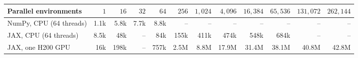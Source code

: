 \begin{tabular}{lrrrrrrrrrrr}
\toprule
Parallel environments & $1$ & $16$ & $32$ & $64$ & $256$ & $1{,}024$ & $4{,}096$ & $16{,}384$ & $65{,}536$ & $131{,}072$ & $262{,}144$ \\
\midrule
NumPy, CPU (64 threads) & 1.1k & 5.8k & 7.7k & 8.8k & -- & -- & -- & -- & -- & -- & -- \\
JAX, CPU (64 threads) & 8.5k & 48k & -- & 84k & 155k & 411k & 474k & 548k & 684k & -- & -- \\
JAX, one H200 GPU & 16k & 198k & -- & 757k & 2.5M & 8.8M & 17.9M & 31.4M & 38.1M & 40.8M & 42.8M \\
\bottomrule
\end{tabular}
